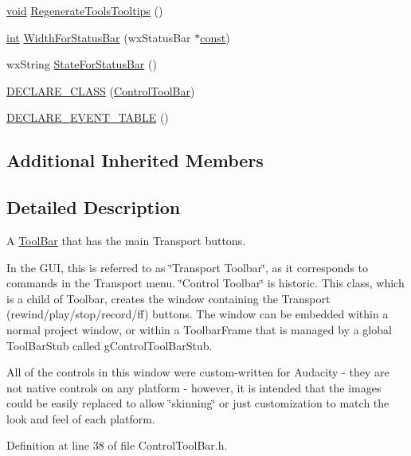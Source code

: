 \begin{DoxyCompactItemize}
\item 
\hyperlink{sound_8c_ae35f5844602719cf66324f4de2a658b3}{void} \hyperlink{class_control_tool_bar_a14eea71db3441ed660fbad1ffba73419}{Regenerate\+Tools\+Tooltips} ()
\item 
\hyperlink{xmltok_8h_a5a0d4a5641ce434f1d23533f2b2e6653}{int} \hyperlink{class_control_tool_bar_af405e341d180174fec27650d674c34d1}{Width\+For\+Status\+Bar} (wx\+Status\+Bar $\ast$\hyperlink{getopt1_8c_a2c212835823e3c54a8ab6d95c652660e}{const})
\item 
wx\+String \hyperlink{class_control_tool_bar_a103246fc572b077d65b7b2a1a0ba4b69}{State\+For\+Status\+Bar} ()
\item 
\hyperlink{class_control_tool_bar_ae27c008f22af7aa7a9a26f110642f0f3}{D\+E\+C\+L\+A\+R\+E\+\_\+\+C\+L\+A\+SS} (\hyperlink{class_control_tool_bar}{Control\+Tool\+Bar})
\item 
\hyperlink{class_control_tool_bar_a184bf68f74ddd817acc9bf19d5cc2b97}{D\+E\+C\+L\+A\+R\+E\+\_\+\+E\+V\+E\+N\+T\+\_\+\+T\+A\+B\+LE} ()
\end{DoxyCompactItemize}
\subsection*{Additional Inherited Members}


\subsection{Detailed Description}
A \hyperlink{class_tool_bar}{Tool\+Bar} that has the main Transport buttons. 

In the G\+UI, this is referred to as \char`\"{}\+Transport Toolbar\char`\"{}, as it corresponds to commands in the Transport menu. \char`\"{}\+Control Toolbar\char`\"{} is historic. This class, which is a child of Toolbar, creates the window containing the Transport (rewind/play/stop/record/ff) buttons. The window can be embedded within a normal project window, or within a Toolbar\+Frame that is managed by a global Tool\+Bar\+Stub called g\+Control\+Tool\+Bar\+Stub.

All of the controls in this window were custom-\/written for Audacity -\/ they are not native controls on any platform -\/ however, it is intended that the images could be easily replaced to allow \char`\"{}skinning\char`\"{} or just customization to match the look and feel of each platform. 

Definition at line 38 of file Control\+Tool\+Bar.\+h.



